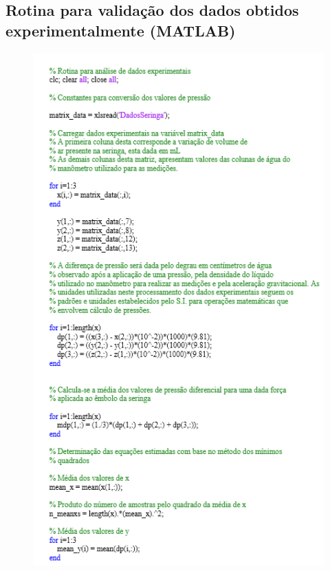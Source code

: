 \begin{apendicesenv}
\chapter{Rotina para validação dos dados obtidos experimentalmente (MATLAB)}

\begin{figure}[H]
    \centering
      \includegraphics[scale=1.0]{figuras/rotina1.png}
    \label{rotina1}
\end{figure}


\end{apendicesenv}
